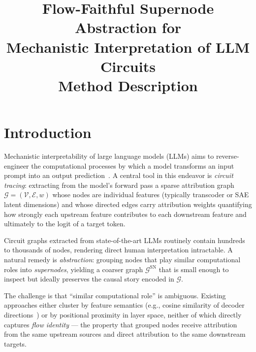 \documentclass[11pt]{article}
\title{\textbf{Flow-Faithful Supernode Abstraction for\\
Mechanistic Interpretation of LLM Circuits}\\[0.5em]
\large Method Description}
\author{}
\date{}
\newcommand{\cG}{\mathcal{G}}
\newcommand{\cV}{\mathcal{V}}
\newcommand{\cE}{\mathcal{E}}
\newcommand{\1}{\mathbbm{1}}
\begin{document}
\maketitle
\tableofcontents
\newpage

\section{Introduction}
\label{sec:intro}

Mechanistic interpretability of large language models (LLMs) aims to reverse-engineer the computational processes by which a model transforms an input prompt into an output prediction~\citep{elhage2021mathematical, wang2022interpretability}.
A central tool in this endeavor is \emph{circuit tracing}: extracting from the model's forward pass a sparse attribution graph $\cG = (\cV, \cE, w)$ whose nodes are individual features (typically transcoder or SAE latent dimensions) and whose directed edges carry attribution weights quantifying how strongly each upstream feature contributes to each downstream feature and ultimately to the logit of a target token.

Circuit graphs extracted from state-of-the-art LLMs routinely contain hundreds to thousands of nodes, rendering direct human interpretation intractable.
A natural remedy is \emph{abstraction}: grouping nodes that play similar computational roles into \emph{supernodes}, yielding a coarser graph $\cG^{\mathrm{SN}}$ that is small enough to inspect but ideally preserves the causal story encoded in $\cG$.

The challenge is that ``similar computational role'' is ambiguous.
Existing approaches either cluster by feature semantics (e.g., cosine similarity of decoder directions~\citep{cunningham2023sparse}) or by positional proximity in layer space, neither of which directly captures \emph{flow identity} — the property that grouped nodes receive attribution from the same upstream sources and direct attribution to the same downstream targets.
\end{document}
